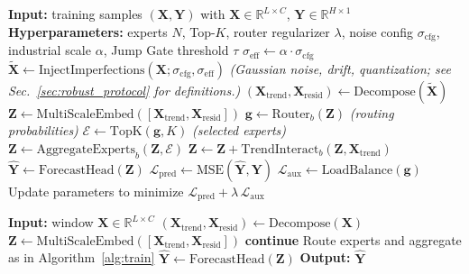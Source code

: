 \documentclass[review,3p,times]{elsarticle}
\begin{document}
\begin{algorithm}[t]
\caption{Ultra-LSNT training with SCADA imperfection injection}
\label{alg:train}
\begin{algorithmic}[1]
\STATE \textbf{Input:} training samples $(\mathbf{X},\mathbf{Y})$ with $\mathbf{X}\in\mathbb{R}^{L\times C}$, $\mathbf{Y}\in\mathbb{R}^{H\times 1}$
\STATE \textbf{Hyperparameters:} experts $N$, Top-$K$, router regularizer $\lambda$, noise config $\sigma_{\mathrm{cfg}}$, industrial scale $\alpha$, Jump Gate threshold $\tau$
\STATE $\sigma_{\mathrm{eff}} \leftarrow \alpha \cdot \sigma_{\mathrm{cfg}}$
\STATE $\tilde{\mathbf{X}} \leftarrow \mathrm{InjectImperfections}(\mathbf{X}; \sigma_{\mathrm{cfg}},\sigma_{\mathrm{eff}})$
\STATE \hspace{1em}\textit{(Gaussian noise, drift, quantization; see Sec.~\ref{sec:robust_protocol} for definitions.)}
\STATE $(\mathbf{X}_{\mathrm{trend}},\mathbf{X}_{\mathrm{resid}}) \leftarrow \mathrm{Decompose}(\tilde{\mathbf{X}})$
\STATE $\mathbf{Z} \leftarrow \mathrm{MultiScaleEmbed}([\mathbf{X}_{\mathrm{trend}},\mathbf{X}_{\mathrm{resid}}])$
 \STATE $\mathbf{g}\leftarrow \mathrm{Router}_b(\mathbf{Z})$ \hspace{1em}\textit{(routing probabilities)}
 \STATE $\mathcal{E}\leftarrow \mathrm{TopK}(\mathbf{g},K)$ \hspace{1em}\textit{(selected experts)}
 \STATE $\mathbf{Z}\leftarrow \mathrm{AggregateExperts}_b(\mathbf{Z},\mathcal{E})$
 \STATE $\mathbf{Z}\leftarrow \mathbf{Z} + \mathrm{TrendInteract}_b(\mathbf{Z},\mathbf{X}_{\mathrm{trend}})$
\ENDFOR
\STATE $\hat{\mathbf{Y}} \leftarrow \mathrm{ForecastHead}(\mathbf{Z})$
\STATE $\mathcal{L}_{\mathrm{pred}} \leftarrow \mathrm{MSE}(\hat{\mathbf{Y}},\mathbf{Y})$
\STATE $\mathcal{L}_{\mathrm{aux}} \leftarrow \mathrm{LoadBalance}(\mathbf{g})$
\STATE Update parameters to minimize $\mathcal{L}_{\mathrm{pred}} + \lambda\,\mathcal{L}_{\mathrm{aux}}$
\end{algorithmic}
\end{algorithm}
\begin{algorithm}[t]
\caption{Edge inference with Jump Gate}
\label{alg:infer}
\begin{algorithmic}[1]
\STATE \textbf{Input:} window $\mathbf{X}\in\mathbb{R}^{L\times C}$
\STATE $(\mathbf{X}_{\mathrm{trend}},\mathbf{X}_{\mathrm{resid}}) \leftarrow \mathrm{Decompose}(\mathbf{X})$
\STATE $\mathbf{Z} \leftarrow \mathrm{MultiScaleEmbed}([\mathbf{X}_{\mathrm{trend}},\mathbf{X}_{\mathrm{resid}}])$
 \STATE \textbf{continue}
 \ENDIF
 \STATE Route experts and aggregate as in Algorithm~\ref{alg:train}
\ENDFOR
\STATE $\hat{\mathbf{Y}} \leftarrow \mathrm{ForecastHead}(\mathbf{Z})$
\STATE \textbf{Output:} $\hat{\mathbf{Y}}$
\end{algorithmic}
\end{algorithm}
\end{document}
